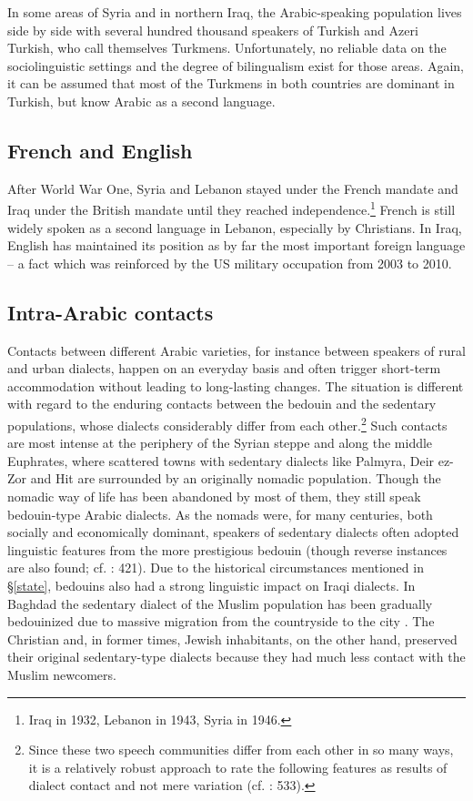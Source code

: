 \documentclass[output=paper]{langsci/langscibook}
\begin{document}
In some areas of Syria and in northern Iraq, the Arabic-speaking population lives side by side with several hundred thousand speakers of Turkish and Azeri Turkish, who call themselves Turkmens. Unfortunately, no reliable data on the sociolinguistic settings and the degree of bilingualism exist for those areas. Again, it can be assumed that most of the Turkmens in both countries are dominant in Turkish, but know Arabic as a second language.

 \subsection{French and English} \label{french}

After World War One, Syria and Lebanon stayed under the French mandate and Iraq under the British mandate until they reached independence.\footnote{Iraq in 1932, Lebanon in 1943, Syria in 1946.} French is still widely spoken as a second language in Lebanon, especially by Christians. In Iraq, English has maintained its position as by far the most important foreign language – a fact which was reinforced by the US military occupation from 2003 to 2010. 

  \subsection{Intra-Arabic contacts} 

Contacts between different Arabic varieties, for instance between speakers of rural and urban dialects, happen on an everyday basis and often trigger short-term accommodation without leading to long-lasting changes. The situation is different with regard to the enduring contacts between the bedouin and the sedentary populations, whose dialects considerably differ from each other.\footnote{Since these two speech communities differ from each other in so many ways, it is a relatively robust approach to rate the following features as results of dialect contact and not mere variation (cf. \citealt{Lucas2015}: 533).} Such contacts are most intense at the periphery of the Syrian steppe and along the middle Euphrates, where scattered towns with sedentary dialects like Palmyra, Deir ez-Zor and Hit are surrounded by an originally nomadic population. Though the nomadic way of life has been abandoned by most of them, they still speak bedouin-type Arabic dialects. As the nomads were, for many centuries, both socially and economically dominant, speakers of sedentary dialects often adopted linguistic features from the more prestigious bedouin (though reverse instances are also found; cf. \citealt{Behnstedt1994Dialektkontakt}: 421). Due to the historical circumstances mentioned in §\ref{state}, bedouins also had a strong linguistic impact on Iraqi dialects. In Baghdad the sedentary dialect of the Muslim population has been gradually bedouinized due to massive migration from the countryside to the city \citep{Palva2009}. The Christian and, in former times, Jewish inhabitants, on the other hand, preserved their original sedentary-type dialects because they had much less contact with the Muslim newcomers. 
\end{document}
